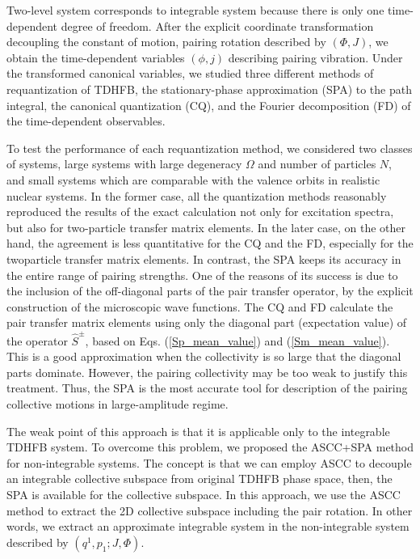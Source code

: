 \documentclass[11pt]{book} %
\begin{document}
Two-level system corresponds to integrable system because there is only one time-dependent degree of freedom. After the explicit coordinate transformation decoupling the constant of motion, pairing rotation described by $(\Phi, J)$, we obtain the time-dependent variables $(\phi, j)$ describing pairing vibration. Under the transformed canonical variables, we studied three different methods of requantization of TDHFB, the stationary-phase approximation (SPA) to the path integral, the canonical quantization (CQ), and the Fourier decomposition (FD) of the time-dependent observables. 

To test the performance of each requantization method, we considered two classes of systems, large systems with large degeneracy $\Omega$ and number of particles $N$, and small systems which are comparable with the valence orbits in realistic nuclear systems. 
In the former case, all the quantization methods reasonably reproduced the results of the
exact calculation not only for excitation spectra, but also for two-particle transfer matrix elements.
In the later case, on the other hand, the agreement is
less quantitative for the CQ and the FD, especially for the twoparticle
transfer matrix elements.
In contrast, the SPA keeps its accuracy in the entire range of
pairing strengths.
One of the reasons of its success is due to the inclusion of the off-diagonal 
parts of the pair transfer operator,
by the explicit construction of the microscopic wave functions.
The CQ and FD calculate the pair transfer matrix elements using only
the diagonal part (expectation value) of the operator $\hat{S}^\pm$,
based on Eqs. (\ref{Sp_mean_value}) and (\ref{Sm_mean_value}).
This is a good approximation when the collectivity is so large that the
diagonal parts dominate.
However, the pairing collectivity may be too weak to justify this
treatment.
Thus, the SPA is the most accurate tool for description of the pairing collective motions in large-amplitude regime.

The weak point of this approach is that it is applicable only to the
integrable TDHFB system. To overcome this problem, we proposed the ASCC+SPA method for non-integrable systems. The concept is that we can employ ASCC to decouple an integrable collective subspace from original TDHFB phase space, then, the SPA is available for the collective subspace.
In this approach, we use the ASCC method to extract the 2D
collective subspace including the pair rotation.
In other words, we extract an approximate integrable system 
in the non-integrable system described by $(q^1,p_1;J,\Phi)$.
\end{document}
